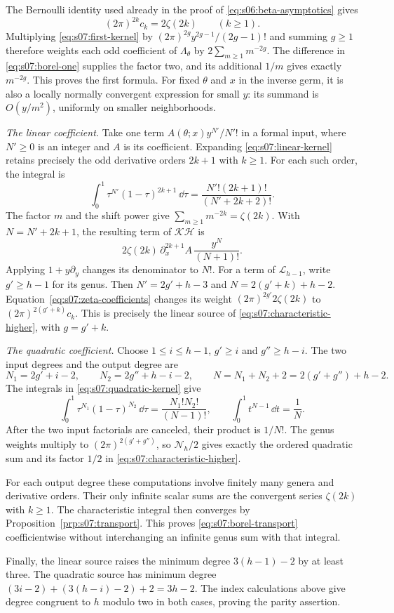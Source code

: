 \begin{prf}
The Bernoulli identity used already in the proof of
\eqref{eq:s06:beta-asymptotics} gives
\begin{equation}\label{eq:s07:zeta-coefficients}
 (2\pi)^{2k}c_k=2\zeta(2k)\qquad(k\geq1).
\end{equation}
Multiplying \eqref{eq:s07:first-kernel} by
$(2\pi)^{2g}y^{2g-1}/(2g-1)!$ and summing $g\geq1$ therefore
weights each odd coefficient of $\Lambda_\theta$ by
$2\sum_{m\geq1}m^{-2g}$. The difference in
\eqref{eq:s07:borel-one} supplies the factor two, and its additional
$1/m$ gives exactly $m^{-2g}$. This proves the first formula.
For fixed $\theta$ and $x$ in the inverse germ, it is also a locally
normally convergent expression for small $y$: its summand is
$O(y/m^2)$, uniformly on smaller neighborhoods.

\smallskip\noindent
\emph{The linear coefficient.}
Take one term $A(\theta;x)y^{N'}/N'!$ in a formal input, where
$N'\geq0$ is an integer and $A$ is its coefficient. Expanding
\eqref{eq:s07:linear-kernel} retains precisely the odd derivative
orders $2k+1$ with $k\geq1$. For each such order, the integral is
\[
 \int_0^1\tau^{N'}(1-\tau)^{2k+1}\,\dd\tau
                   =\frac{N'!(2k+1)!}{(N'+2k+2)!}.
\]
The factor $m$ and the shift power give
$\sum_{m\geq1}m^{-2k}=\zeta(2k)$. With
$N=N'+2k+1$, the resulting term of $\mathcal K\mathcal H$ is
\[
 2\zeta(2k)\,\partial_x^{2k+1}A\,
                              \frac{y^N}{(N+1)!}.
\]
Applying $1+y\partial_y$ changes its denominator to $N!$.
For a term of $\mathcal L_{h-1}$, write
$g'\geq h-1$ for its genus. Then
$N'=2g'+h-3$ and $N=2(g'+k)+h-2$.
Equation~\eqref{eq:s07:zeta-coefficients} changes its weight
$(2\pi)^{2g'}2\zeta(2k)$ to
$(2\pi)^{2(g'+k)}c_k$. This is precisely the linear source of
\eqref{eq:s07:characteristic-higher}, with $g=g'+k$.

\smallskip\noindent
\emph{The quadratic coefficient.}
Choose $1\leq i\leq h-1$, $g'\geq i$ and $g''\geq h-i$.
The two input degrees and the output degree are
\[
 N_1=2g'+i-2,\qquad N_2=2g''+h-i-2,\qquad
 N=N_1+N_2+2=2(g'+g'')+h-2.
\]
The integrals in \eqref{eq:s07:quadratic-kernel} give
\[
 \int_0^1\tau^{N_1}(1-\tau)^{N_2}\,\dd\tau
       =\frac{N_1!N_2!}{(N-1)!},\qquad
 \int_0^1t^{N-1}\,\dd t=\frac1N.
\]
After the two input factorials are canceled, their product is
$1/N!$. The genus weights multiply to
$(2\pi)^{2(g'+g'')}$, so $\mathcal N_h/2$ gives exactly the
ordered quadratic sum and its factor $1/2$ in
\eqref{eq:s07:characteristic-higher}.

For each output degree these computations involve finitely many
genera and derivative orders. Their only infinite scalar sums are
the convergent series $\zeta(2k)$ with $k\geq1$. The characteristic
integral then converges by Proposition~\ref{prp:s07:transport}.
This proves \eqref{eq:s07:borel-transport} coefficientwise without
interchanging an infinite genus sum with that integral.

Finally, the linear source raises the minimum degree
$3(h-1)-2$ by at least three. The quadratic source has minimum
degree $(3i-2)+(3(h-i)-2)+2=3h-2$.
The index calculations above give degree congruent to $h$ modulo
two in both cases, proving the parity assertion.
\end{prf}
